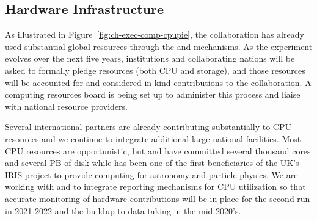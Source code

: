 \subsection{Hardware Infrastructure}
As illustrated in Figure~\ref{fig:ch-exec-comp-cpupie}, the  collaboration has already used substantial global resources through the  and  mechanisms. As the experiment evolves over the next five years, institutions and collaborating nations will be asked to formally pledge resources (both CPU and storage), and those resources will be accounted for and considered in-kind contributions to the collaboration.  A   computing resources board  is being set up to administer this process and liaise with national resource providers. 

Several international partners are already contributing substantially to CPU resources and we continue to  integrate additional large national facilities. Most CPU resources are opportunistic, but  and  have committed several thousand cores and several PB of disk while  has been one of the first beneficiaries of the UK's IRIS project to provide computing for astronomy and particle physics.  
We are working with  and  to integrate reporting mechanisms for CPU utilization so that accurate monitoring of hardware contributions will be in place for the second  run in 2021-2022 and the buildup to data taking in the mid 2020's. 


